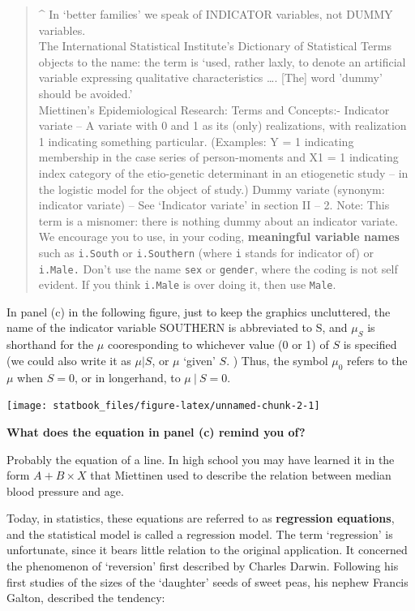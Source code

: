 \documentclass[]{book}
\begin{document}
\begin{quote}
\^{} In `better families' we speak of INDICATOR variables, not DUMMY variables.\\
The International Statistical Institute's Dictionary of Statistical Terms objects to the name: the term is `used, rather laxly, to denote an artificial variable expressing qualitative characteristics \ldots{}. {[}The{]} word 'dummy' should be avoided.'\\
Miettinen's Epidemiological Research: Terms and Concepts:- Indicator variate -- A variate with 0 and 1 as its (only) realizations, with realization 1 indicating something particular. (Examples: Y = 1 indicating membership in the case series of person-moments and X1 = 1 indicating index category of the etio-genetic determinant in an etiogenetic study -- in the logistic model for the object of study.) Dummy variate (synonym: indicator variate) -- See `Indicator variate' in section II -- 2. Note: This term is a misnomer: there is nothing dummy about an indicator variate.\\
We encourage you to use, in your coding, \textbf{meaningful variable names} such as \texttt{i.South} or \texttt{i.Southern} (where \texttt{i} stands for indicator of) or \texttt{i.Male.} Don't use the name \texttt{sex} or \texttt{gender}, where the coding is not self evident. If you think \texttt{i.Male} is over doing it, then use \texttt{Male}.
\end{quote}

In panel (c) in the following figure, just to keep the graphics uncluttered, the name of the indicator variable SOUTHERN is abbreviated to S, and \(\mu_S\) is shorthand for the \(\mu\) cooresponding to whichever value (0 or 1) of \(S\) is specified (we could also write it as \(\mu | S\), or \(\mu\) `given' \(S\). ) Thus, the symbol \(\mu_0\) refers to the \(\mu\) when \(S=0\), or in longerhand, to \(\mu \ | \ S = 0\).

\begin{center}\texttt{[image: statbook\_files/figure-latex/unnamed-chunk-2-1]} \end{center}

\textbf{What does the equation in panel (c) remind you of?}

Probably the equation of a line. In high school you may have learned it in the form \(A + B \times X\) that Miettinen used to describe the relation between median blood pressure and age.

Today, in statistics, these equations are referred to as \textbf{regression equations}, and the statistical model is called a regression model. The term `regression' is unfortunate, since it bears little relation to the original application. It concerned the phenomenon of `reversion' first described by Charles Darwin. Following his first studies of the sizes of the `daughter' seeds of sweet peas, his nephew Francis Galton, described the tendency:
\end{document}

